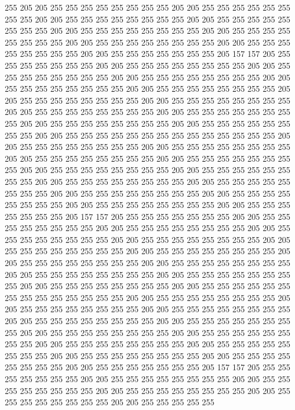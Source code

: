 255 205 205 255 255 255 255 255 255 255 255 205 205 255 255 255 255 255 255 255
255 205 205 255 255 255 255 255 255 255 255 205 205 255 255 255 255 255 255 255
255 205 205 255 255 255 255 255 255 255 255 205 205 255 255 255 255 255 255 255
255 205 205 255 255 255 255 255 255 255 255 205 205 255 255 255 255 255 255 255
255 205 205 255 255 255 255 255 255 255 205 157 157 205 255 255 255 255 255 255
255 205 205 255 255 255 255 255 255 255 255 205 205 255 255 255 255 255 255 255
255 205 205 255 255 255 255 255 255 255 255 205 205 255 255 255 255 255 255 255
255 205 205 255 255 255 255 255 255 255 255 205 205 255 255 255 255 255 255 255
255 205 205 255 255 255 255 255 255 255 255 205 205 255 255 255 255 255 255 255
255 205 205 255 255 255 255 255 255 255 255 205 205 255 255 255 255 255 255 255
255 205 205 255 255 255 255 255 255 255 255 205 205 255 255 255 255 255 255 255
255 255 255 255 255 255 255 205 205 255 255 255 255 255 255 255 255 205 205 255
255 255 255 255 255 255 255 205 205 255 255 255 255 255 255 255 255 205 205 255
255 255 255 255 255 255 255 205 205 255 255 255 255 255 255 255 255 205 205 255
255 255 255 255 255 255 255 205 205 255 255 255 255 255 255 255 255 205 205 255
255 255 255 255 255 255 255 205 205 255 255 255 255 255 255 255 255 205 205 255
255 255 255 255 255 255 255 205 205 255 255 255 255 255 255 255 255 205 205 255
255 255 255 255 255 255 205 157 157 205 255 255 255 255 255 255 255 205 205 255
255 255 255 255 255 255 255 205 205 255 255 255 255 255 255 255 255 205 205 255
255 255 255 255 255 255 255 205 205 255 255 255 255 255 255 255 255 205 205 255
255 255 255 255 255 255 255 205 205 255 255 255 255 255 255 255 255 205 205 255
255 255 255 255 255 255 255 205 205 255 255 255 255 255 255 255 255 205 205 255
255 255 255 255 255 255 255 205 205 255 255 255 255 255 255 255 255 205 205 255
255 255 255 255 255 255 255 205 205 255 255 255 255 255 255 255 255 255 255 255
255 255 255 205 205 255 255 255 255 255 255 255 255 205 205 255 255 255 255 255
255 255 255 205 205 255 255 255 255 255 255 255 255 205 205 255 255 255 255 255
255 255 255 205 205 255 255 255 255 255 255 255 255 205 205 255 255 255 255 255
255 255 255 205 205 255 255 255 255 255 255 255 255 205 205 255 255 255 255 255
255 255 255 205 205 255 255 255 255 255 255 255 255 205 205 255 255 255 255 255
255 255 255 205 205 255 255 255 255 255 255 255 255 205 205 255 255 255 255 255
255 255 205 157 157 205 255 255 255 255 255 255 255 205 205 255 255 255 255 255
255 255 255 205 205 255 255 255 255 255 255 255 255 205 205 255 255 255 255 255
255 255 255 205 205 255 255 255 255 255 255 255 255 205 205 255 255 255 255 255
